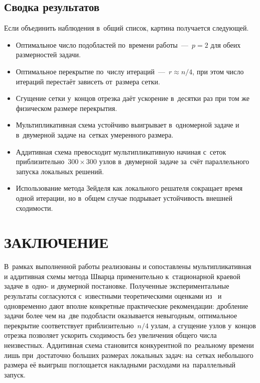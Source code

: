 \subsection{Сводка результатов}

Если объединить наблюдения в~общий список, картина получается следующей.
\begin{itemize}
	\item Оптимальное число подобластей по~времени работы~---~$p=2$ для
	      обеих размерностей задачи.
	\item Оптимальное перекрытие по~числу итераций~---~$r\approx n/4$, при
	      этом число итераций перестаёт зависеть от~размера сетки.
	\item Сгущение сетки у~концов отрезка даёт ускорение в~десятки раз при
	      том же физическом размере перекрытия.
	\item Мультипликативная схема устойчиво выигрывает в~одномерной задаче и
	      в~двумерной задаче на~сетках умеренного размера.
	\item Аддитивная схема превосходит мультипликативную начиная с~сеток
	      приблизительно~$300\times 300$ узлов в~двумерной задаче за~счёт
	      параллельного запуска локальных решений.
	\item Использование метода Зейделя как локального решателя сокращает
	      время одной итерации, но в~общем случае подрывает устойчивость внешней
	      сходимости.
\end{itemize}

\section*{ЗАКЛЮЧЕНИЕ}

В~рамках выполненной работы реализованы и сопоставлены мультипликативная и
аддитивная схемы метода Шварца применительно к~стационарной краевой задаче
в~одно- и двумерной постановке. Полученные экспериментальные результаты
согласуются с~известными теоретическими оценками из~\cite{toselli2005,
	quarteroni1999} и одновременно дают вполне конкретные практические
рекомендации: дробление задачи более чем на~две подобласти оказывается
невыгодным, оптимальное перекрытие соответствует приблизительно~$n/4$
узлам, а сгущение узлов у~концов отрезка позволяет ускорить сходимость без
увеличения общего числа неизвестных. Аддитивная схема становится
конкурентной по~реальному времени лишь при~достаточно больших размерах
локальных задач: на~сетках небольшого размера её выигрыш поглощается
накладными расходами на~параллельный запуск.

